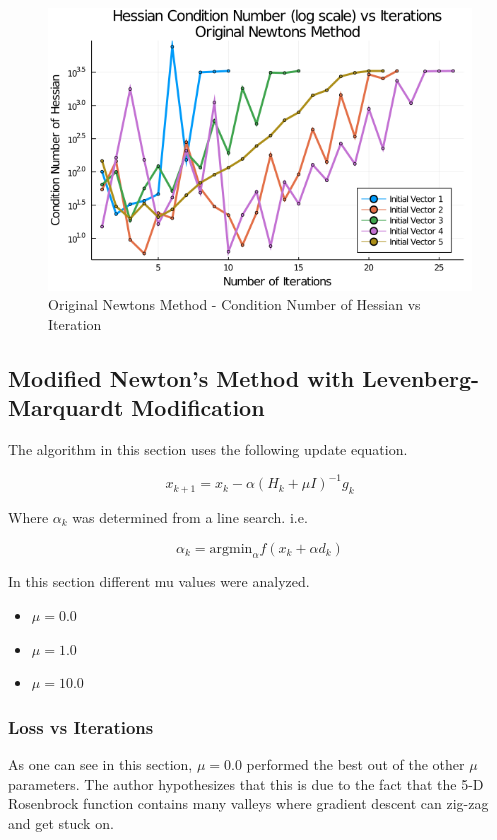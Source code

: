 \documentclass{article}
\begin{document}
    \begin{figure}[H]
        \centering
        \includegraphics[width=0.5\linewidth]{./OriginalNewtonsMethod_ConditionNumberHessianPlot.png}
        \caption{Original Newtons Method - Condition Number of Hessian vs Iteration}
        \label{fig:OriginalNewtonsMethod_ConditionNumberHessianPlot.png}
    \end{figure}

    \subsection{Modified Newton's Method with Levenberg-Marquardt Modification}

    The algorithm in this section uses the following update equation.

    \begin{equation}
        x_{k+1} = x_k - \alpha (H_k + \mu I)^{-1} g_k
    \end{equation}

    Where $\alpha_k$ was determined from a line search. i.e.

    \begin{equation}
        \alpha_k = \text{argmin}_{\alpha} f(x_k + \alpha d_k)
    \end{equation}

    In this section different mu values were analyzed.
    \begin{itemize}
        \item $\mu = 0.0$
        \item $\mu = 1.0$
        \item $\mu = 10.0$
    \end{itemize}

    \subsubsection{Loss vs Iterations}
    
    As one can see in this section, $\mu = 0.0$ performed the best out of the other $\mu$ parameters.
    The author hypothesizes that this is due to the fact that the 5-D Rosenbrock function contains many valleys where gradient descent can zig-zag and get stuck on.
\end{document}
